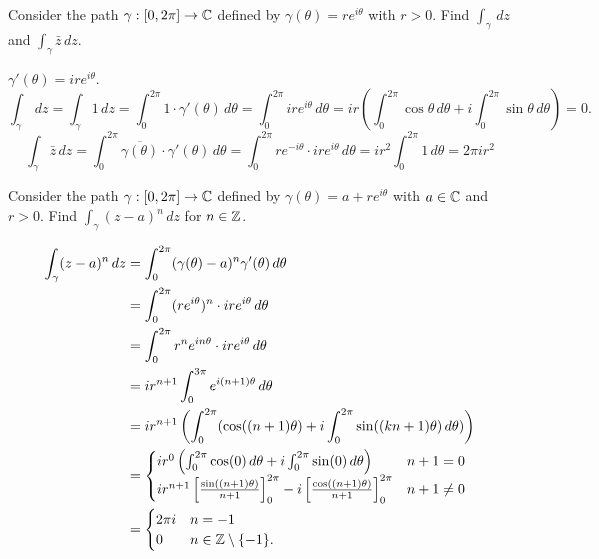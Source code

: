 \documentclass[10pt, a4paper]{article}
\begin{document}
\begin{example}
    Consider the path $\gamma : [0, 2\pi] \to \mathbb{C}$ defined by $\gamma(\theta) = re ^ {i\theta}$ with $r > 0$.
    Find $\int_{\gamma}\,dz$ and $\int_{\gamma}\bar{z}\,dz$.

    \begin{solution}
        $\gamma'(\theta) = ire ^ {i\theta}$.
        \[
        \int_{\gamma}\,dz = \int_{\gamma}1\,dz = \int_{0}^{2\pi}1\cdot\gamma'(\theta)\,d\theta = \int_{0}^{2\pi}ire ^ {i\theta}\,d\theta = ir\left(\int_{0}^{2\pi}\cos{\theta}\,d\theta + i\int_{0}^{2\pi}\sin{\theta}\,d\theta\right) = 0.
        \]
        \[
        \int_{\gamma}\bar{z}\,dz = \int_{0}^{2\pi}\overline{\gamma(\theta)} \cdot \gamma'(\theta)\,d\theta = \int_{0}^{2\pi}re ^ {-i\theta}\cdot ire ^ {i\theta}\,d\theta = ir ^ 2\int_{0}^{2\pi}1\,d\theta = 2\pi ir ^ 2
        \]
    \end{solution}
\end{example}

\begin{example}
    Consider the path $\gamma : [0, 2\pi] \to \mathbb{C}$ defined by $\gamma(\theta) = a + re ^ {i\theta}$ with $a \in \mathbb{C}$ and $r > 0$.
    Find $\int_{\gamma}(z - a) ^ n\,dz$ for $n \in \mathbb{Z}$.

    \begin{solution}
        \begin{align*}
            \int_{\gamma}(z - a) ^ n\,dz &= \int_{0}^{2\pi}(\gamma(\theta) - a) ^ n\gamma'(\theta)\,d\theta \\
            &= \int_{0}^{2\pi}(re ^ {i\theta}) ^ n\cdot ire ^ {i\theta}\,d\theta \\
            &= \int_{0}^{2\pi}r ^ ne ^ {in\theta}\cdot ire ^ {i\theta}\,d\theta \\
            &= ir ^ {n + 1}\int_{0}^{3\pi}e ^ {i(n + 1)\theta}\,d\theta \\
            &= ir ^ {n + 1}\left(\int_{0}^{2\pi}(\cos((n + 1)\theta) + i\int_{0}^{2\pi}\sin((kn+ 1)\theta)\,d\theta)\right) \\
            &= \begin{cases}
                ir ^ 0\left(\int_{0}^{2\pi}\cos(0)\,d\theta + i\int_{0}^{2\pi}\sin(0)\,d\theta\right) & n + 1 = 0 \\
                ir ^ {n + 1}\left[\frac{\sin((n + 1)\theta)}{n + 1}\right]_{0}^{2\pi} - i\left[\frac{\cos((n + 1)\theta)}{n + 1}\right]_{0}^{2\pi} & n + 1 \neq 0
            \end{cases} \\
            &= \begin{cases}
                2\pi i & n = -1 \\
                0 & n \in \mathbb{Z} \setminus \{-1\}.
            \end{cases}
        \end{align*}
    \end{solution}
\end{example}
\end{document}
